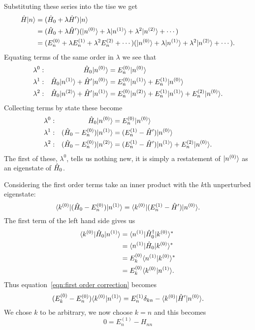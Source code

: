     Substituting these series into the \gls{tise} we get
    \begin{align*}
        \hat{H}\vert {n} \rangle &= (\hat{H}_0 + \lambda\hat{H}')\vert {n} \rangle\\
        &= (\hat{H}_0 + \lambda\hat{H}')(\vert {n^{(0)}} \rangle + \lambda\vert {n^{(1)}} \rangle + \lambda^2\vert {n^{(2)}} \rangle + \dotsb)\\
        &= (E_n^{(0)} + \lambda E_n^{(1)} + \lambda^2E_n^{(2)} + \dotsb)(\vert {n^{(0)}} \rangle + \lambda\vert {n^{(1)}} \rangle + \lambda^2\vert {n^{(2)}} \rangle + \dotsb).
    \end{align*}
    Equating terms of the same order in \(\lambda\) we see that
    \begin{align*}
        \lambda^0: && \hat{H}_0\vert {n^{(0)}} \rangle &= E_n^{(0)}\vert {n^{(0)}} \rangle\\
        \lambda^1: && \hat{H}_0\vert {n^{(1)}} \rangle + \hat{H}'\vert {n^{(0)}} \rangle &= E_n^{(0)}\vert {n^{(1)}} \rangle + E_n^{(1)}\vert {n^{(0)}} \rangle\\
        \lambda^2: && \hat{H}_0\vert {n^{(2)}} \rangle + \hat{H}'\vert {n^{(1)}} \rangle &= E_n^{(0)}\vert {n^{(2)}} \rangle + E_n^{(1)}\vert {n^{(1)}} \rangle + E_n^{(2)}\vert {n^{(0)}} \rangle.
    \end{align*}
    Collecting terms by state these become
    \begin{align*}
        \lambda^0: && \hat{H}_0\vert {n^{(0)}} \rangle &= E_n^{(0)}\vert {n^{(0)}} \rangle\\
        \lambda^1: && (\hat{H}_0 - E_n^{(0)})\vert {n^{(1)}} \rangle &= (E_n^{(1)} - \hat{H}')\vert {n^{(0)}} \rangle\\
        \lambda^2: && (\hat{H}_0 - E_n^{(0)})\vert {n^{(2)}} \rangle &= (E_n^{(1)} - \hat{H}')\vert {n^{(1)}} \rangle + E_n^{(2)}\vert {n^{(0)}} \rangle.
    \end{align*}
    The first of these, \(\lambda^0\), tells us nothing new, it is simply a restatement of \(\vert {n^{(0)}} \rangle\) as an eigenstate of \(\hat{H}_0\).
    
    Considering the first order terms take an inner product with the \(k\)th unperturbed eigenstate:
    \begin{equation}\label{eqn:first order correction}
        \langle {k^{(0)}} \vert(\hat{H}_0 - E_n^{(0)})\vert {n^{(1)}} \rangle = 	\langle {k^{(0)}} \vert(E_n^{(1)} - \hat{H}')\vert {n^{(0)}} \rangle.
    \end{equation}
    The first term of the left hand side gives us
    \begin{align*}
        \langle {k^{(0)}} \vert\hat{H}_0\vert {n^{(1)}} \rangle &= \langle {n^{(1)}} \vert\hat{H}_0^\dagger \vert {k^{(0)}} \rangle^*\\
        &= \langle {n^{(1)}} \vert\hat{H}_0\vert {k^{(0)}} \rangle^*\\
        &= E_k^{(0)}\langle {n^{(1)}} \vert {k^{(0)}} \rangle^*\\
        &= E_k^{(0)}\langle {k^{(0)}} \vert {n^{(1)}} \rangle.
    \end{align*}
    Thus equation~\ref{eqn:first order correction} becomes
    \[(E_k^{(0)} - E_n^{(0)})\langle {k^{(0)}} \vert {n^{(1)}} \rangle = E_n^{(1)}\delta_{kn} - \langle {k^{(0)}} \vert\hat{H}'\vert {n^{(0)}} \rangle.\]
    We chose \(k\) to be arbitrary, we now choose \(k = n\) and this becomes
    \[0 = E_n^{(1)} - H_{nn}\]
    
